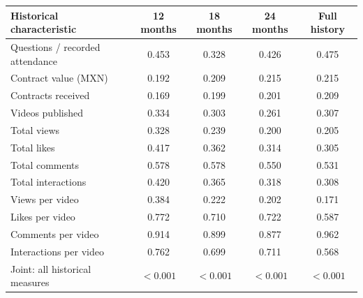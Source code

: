 \begingroup\small
\setlength{\tabcolsep}{3pt}
\renewcommand{\arraystretch}{1.25}
\noindent%
\begin{tabular*}{\linewidth}{@{\extracolsep{\fill}}lcccc@{}}
\toprule
Historical characteristic & 12 months & 18 months & 24 months & Full history \\
\midrule
Questions / recorded attendance & 0.453 & 0.328 & 0.426 & 0.475 \\
\addlinespace
Contract value (MXN) & 0.192 & 0.209 & 0.215 & 0.215 \\
Contracts received & 0.169 & 0.199 & 0.201 & 0.209 \\
\addlinespace
Videos published & 0.334 & 0.303 & 0.261 & 0.307 \\
Total views & 0.328 & 0.239 & 0.200 & 0.205 \\
Total likes & 0.417 & 0.362 & 0.314 & 0.305 \\
Total comments & 0.578 & 0.578 & 0.550 & 0.531 \\
Total interactions & 0.420 & 0.365 & 0.318 & 0.308 \\
Views per video & 0.384 & 0.222 & 0.202 & 0.171 \\
Likes per video & 0.772 & 0.710 & 0.722 & 0.587 \\
Comments per video & 0.914 & 0.899 & 0.877 & 0.962 \\
Interactions per video & 0.762 & 0.699 & 0.711 & 0.568 \\
\midrule
Joint: all historical measures & $<0.001$ & $<0.001$ & $<0.001$ & $<0.001$ \\
\bottomrule
\end{tabular*}\par\endgroup
